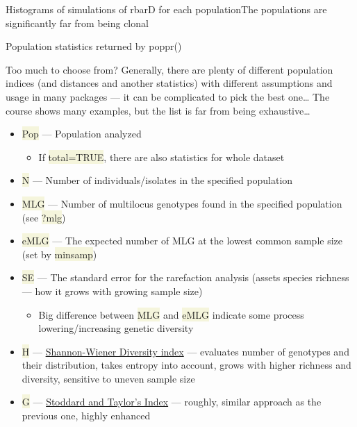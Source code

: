 \documentclass[compress, ucs, xelatex, 11pt, xcolor=svgnames, aspectratio=169,
	hyperref={
		bookmarks=true,
		unicode=true,
		colorlinks=true,
		pdftitle={Molecular data in R},
		plainpages=false,
		pdfauthor={Vojtech Zeisek},
		pdfsubject={Course about phylogeny and evolution in R},
		pdfcreator={XeLaTeX},
		pdfkeywords={R, evolution, phylogeny, molecular data},
		linkcolor=Crimson, %
		anchorcolor=Magenta, %
		citecolor=Magenta, %
		filecolor=Magenta, %
		menucolor=Magenta, %
		urlcolor=DodgerBlue, %
		pdftex},
	url={hyphens, lowtilde} %
	]{beamer}
\renewcommand{\texttt}[1]{\colorbox{Beige}{{\ttfamily #1}}}
\begin{document}
\begin{frame}{Histograms of simulations of rbarD for each population}{The populations are significantly far from being clonal}
	\begin{center}
		\texttt{[image: poppr.png]}
	\end{center}
\end{frame}

\begin{frame}[allowframebreaks]{Population statistics returned by poppr()}
	\begin{block}{Too much to choose from?}
		Generally, there are plenty of different population indices (and distances and another statistics) with different assumptions and usage in many packages --- it can be complicated to pick the best one\ldots{ }The course shows many examples, but the list is far from being exhaustive\ldots
	\end{block}
	\begin{itemize}
		\item \texttt{Pop} --- Population analyzed
		\begin{itemize}
			\item If \texttt{total=TRUE}, there are also statistics for whole dataset
		\end{itemize}
		\item \texttt{N} --- Number of individuals/isolates in the specified population
		\item \texttt{MLG} --- Number of multilocus genotypes found in the specified population (see \texttt{?mlg})
		\item \texttt{eMLG} --- The expected number of MLG at the lowest common sample size (set by \texttt{minsamp})
		\item \texttt{SE} --- The standard error for the rarefaction analysis (assets species richness --- how it grows with growing sample size)
		\begin{itemize}
			\item Big difference between \texttt{MLG} and \texttt{eMLG} indicate some process lowering/increasing genetic diversity
		\end{itemize}
		\item \texttt{H} --- \href{https://en.wikipedia.org/wiki/Diversity_index\#Shannon_index}{Shannon-Wiener Diversity index} --- evaluates number of genotypes and their distribution, takes entropy into account, grows with higher richness and diversity, sensitive to uneven sample size
		\item \texttt{G} --- \href{https://www.genetics.org/content/118/4/705}{Stoddard and Taylor's Index} --- roughly, similar approach as the previous one, highly enhanced

\end{itemize}
\end{frame}
\end{document}
